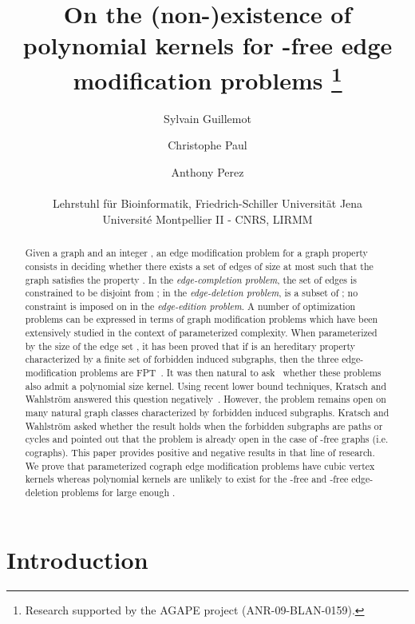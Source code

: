 \documentclass[11pt]{article}
\begin{document}
\title{\textbf{On the (non-)existence of polynomial kernels for -free edge modification problems}
\thanks{Research supported by the AGAPE project  (ANR-09-BLAN-0159).}}


\author{Sylvain Guillemot \and Christophe Paul \and Anthony Perez \\\\
 Lehrstuhl f\"ur Bioinformatik, Friedrich-Schiller Universit\"at Jena \\
 Universit\'e Montpellier II - CNRS, LIRMM}


\date{}

\maketitle


\begin{abstract}
Given a graph  and an integer , an edge modification problem for a graph property  consists in deciding whether there exists a set of edges  of size at most  such that the graph  satisfies the property . In the  \emph{edge-completion problem}, the set  of edges is constrained to be disjoint from ; in the  \emph{edge-deletion problem},  is a subset of ; no constraint is imposed on  in the  \emph{edge-edition problem}. 
A number of optimization problems can be expressed in terms of graph modification problems which have been extensively studied in the context of parameterized complexity. When parameterized by the size  of the edge set , it has been proved that if  is an hereditary property characterized by a finite set of forbidden induced subgraphs, then the three  edge-modification problems are FPT~\cite{Cai96}. It was then natural to ask~\cite{Cai96} whether these problems also admit a polynomial size kernel. Using recent lower bound techniques, Kratsch and Wahlstr\"om answered this question negatively~\cite{KW09}. However, the problem remains open on many natural graph classes characterized by forbidden induced subgraphs. Kratsch and Wahlstr\"om asked whether the result holds when the forbidden subgraphs are paths or cycles and pointed out that the problem is already open in the case of -free graphs (i.e. cographs). This paper provides positive and negative results in that line of research. We prove that parameterized cograph edge modification problems have cubic vertex kernels whereas polynomial kernels are unlikely to exist for the -free and -free edge-deletion problems for large enough .
\end{abstract}


\section{Introduction}
\end{document}
